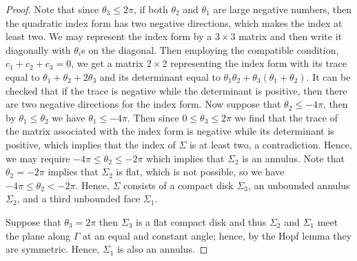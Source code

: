 \documentclass[10pt,a4paper]{amsart}
\theoremstyle{theorem}
\theoremstyle{definition}
\numberwithin{equation}{section}
\begin{document}
\begin{proof}
Note that since $\theta_3\leq 2\pi$, if both $\theta_2$ and $\theta_1$ are large negative numbers, then the quadratic index form has two negative directions, which makes the index at least two. We may represent the index form by a $3\times 3$ matrix and then write it diagonally with $\theta_i$s on the diagonal. Then employing the compatible condition, $c_1+c_2+c_3=0$, we get a matrix $2\times 2$ representing the index form with its trace equal to $\theta_1+\theta_2+2\theta_3$ and its determinant equal to $\theta_1\theta_2+\theta_3(\theta_1+\theta_2)$. It can be checked that if the trace is negative while the determinant is positive, then there are two negative directions for the index form. Now suppose that $\theta_2 \leq -4\pi$, then by $\theta_1\leq \theta_2$ we have $\theta_1 \leq -4\pi$. Then since $0\leq \theta_3\leq 2\pi$ we find that the trace of the matrix associated with the index form is negative while its determinant is positive, which implies that the index of $\Sigma$ is at least two, a contradiction. Hence, we may require $-4\pi \leq \theta_2\leq -2\pi$ which implies that $\Sigma_2$ is an annulus. Note that $\theta_2=-2\pi$ implies that $\Sigma_2$ is flat, which is not possible, so we have $-4\pi \leq \theta_2< -2\pi$. Hence, $\Sigma$ consists of a compact disk $\Sigma_3$, an unbounded annulus $\Sigma_2$, and a third unbounded face $\Sigma_1$. 
\medskip

Suppose that $\theta_3 =2\pi$ then $\Sigma_3$ is a flat compact disk and thus $\Sigma_2$ and $\Sigma_1$ meet the plane along $\Gamma$ at an equal and constant angle; hence, by the Hopf lemma they are symmetric. Hence, $\Sigma_1$ is also an annulus. 


\end{proof}
\end{document}
